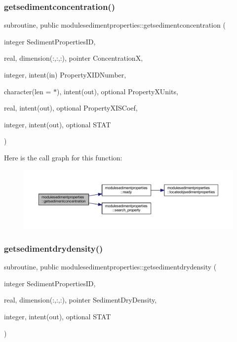 \subsubsection{\texorpdfstring{getsedimentconcentration()}{getsedimentconcentration()}}
{\footnotesize\ttfamily subroutine, public modulesedimentproperties\+::getsedimentconcentration (\begin{DoxyParamCaption}\item[{integer}]{Sediment\+Properties\+ID,  }\item[{real, dimension(\+:,\+:,\+:), pointer}]{ConcentrationX,  }\item[{integer, intent(in)}]{Property\+X\+I\+D\+Number,  }\item[{character(len = $\ast$), intent(out), optional}]{Property\+X\+Units,  }\item[{real, intent(out), optional}]{Property\+X\+I\+S\+Coef,  }\item[{integer, intent(out), optional}]{S\+T\+AT }\end{DoxyParamCaption})}

Here is the call graph for this function\+:\nopagebreak
\begin{figure}[H]
\begin{center}
\leavevmode
\includegraphics[width=350pt]{namespacemodulesedimentproperties_adaa8d0935c5e2ecaae01dd156ea881ca_cgraph}
\end{center}
\end{figure}
\mbox{\label{namespacemodulesedimentproperties_ac8feadd6cbbbb852c325a183475aaa8c}} 
\subsubsection{\texorpdfstring{getsedimentdrydensity()}{getsedimentdrydensity()}}
{\footnotesize\ttfamily subroutine, public modulesedimentproperties\+::getsedimentdrydensity (\begin{DoxyParamCaption}\item[{integer}]{Sediment\+Properties\+ID,  }\item[{real, dimension(\+:,\+:,\+:), pointer}]{Sediment\+Dry\+Density,  }\item[{integer, intent(out), optional}]{S\+T\+AT }\end{DoxyParamCaption})}

